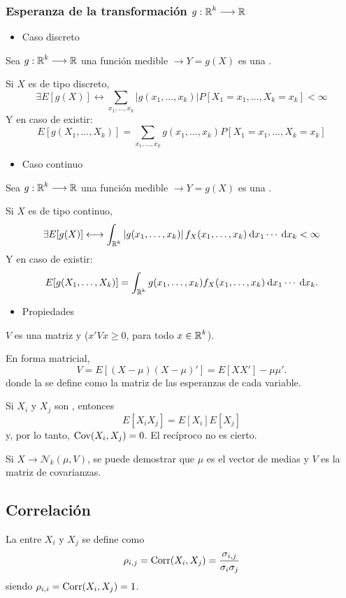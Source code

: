 \subsubsection{Esperanza de la transformación $g:\operatorname{\mathbb{R}}^k\longrightarrow\operatorname{\mathbb{R}}$}
\begin{itemize}[label=\color{red}\textbullet, leftmargin=*]
	\item \color{lightblue}Caso discreto
\end{itemize}
Sea $g:\operatorname{\mathbb{R}}^k\longrightarrow\operatorname{\mathbb{R}}$ una función medible $\longrightarrow Y=g(X)$ es una \va. 

Si $X$ es de tipo discreto, \[ \exists E[g(X)]\longleftrightarrow\sum_{x_1,\dots,x_k}\left|g(x_1,\dots,x_k)\right|P[X_1=x_1,\dots,X_k=x_k]<\infty \]
Y en caso de existir: \[ E[g(X_1,\dots,X_k)]=\sum_{x_1,\dots,x_k}g(x_1,\dots,x_k)P[X_1=x_1,\dots,X_k=x_k] \]
\begin{itemize}[label=\color{red}\textbullet, leftmargin=*]
	\item \color{lightblue}Caso continuo
\end{itemize}
Sea $g:\operatorname{\mathbb{R}}^k\longrightarrow\operatorname{\mathbb{R}}$ una función medible $\longrightarrow Y=g(X)$ es una \va.

Si $X$ es de tipo continuo, \[ \exists E[g(X)]\longleftrightarrow\int_{\operatorname{\mathbb{R}}^k}\left|g(x_1,\dots,x_k)\right|f_X(x_1,\dots,x_k)\:\mathrm{d}x_1\cdots\:\mathrm{d}x_k<\infty \]
Y en caso de existir: \[ E[g(X_1,\dots,X_k)]=\int_{\operatorname{\mathbb{R}}^k}g(x_1,\dots,x_k)f_X(x_1,\dots,x_k)\:\mathrm{d}x_1\cdots\:\mathrm{d}x_k. \]
\begin{itemize}[label=\color{red}\textbullet, leftmargin=*]
	\item \color{lightblue}Propiedades
\end{itemize}
$V$ es una matriz  y  ($x'Vx\ge0$, para todo $x\in\operatorname{\mathbb{R}}^k$).

En forma matricial, \[ V=E\left[(X-\mu)(X-\mu)'\right]=E[XX']-\mu\mu'.\] donde la  se define como la matriz de las esperanzas de cada variable.

Si $X_i$ y $X_j$ son , entonces \[ E[X_iX_j]=E[X_i]E[X_j] \]y, por lo tanto, $\operatorname{Cov}(X_i,X_j)=0$. El recíproco no es cierto.

Si $X\longrightarrow\mathcal{N}_k(\mu, V)$, se puede demostrar que $\mu$ es el vector de medias y $V$ es la matriz de covarianzas.
\subsection{Correlación}
La  entre $X_i$ y $X_j$ se define como \[ \rho_{i,j}=\operatorname{Corr}(X_i,X_j)=\dfrac{\sigma_{i,j}}{\sigma_i\sigma_j} \]siendo $\rho_{i,i}=\operatorname{Corr}(X_i,X_j)=1$.

